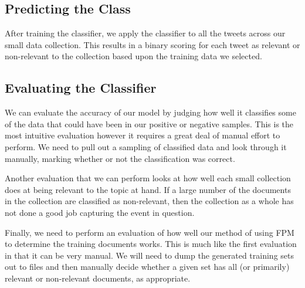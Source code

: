 
\subsection{Predicting the Class}

After training the classifier, we apply the classifier to all the tweets across our small data collection. This results in a binary scoring for each tweet as relevant or non-relevant to the collection based upon the training data we selected.

\subsection{Evaluating the Classifier}

We can evaluate the accuracy of our model by judging how well it classifies some of the data that could have been in our positive or negative samples. This is the most intuitive evaluation however it requires a great deal of manual effort to perform. We need to pull out a sampling of classified data and look through it manually, marking whether or not the classification was correct.

Another evaluation that we can perform looks at how well each small collection does at being relevant to the topic at hand. If a large number of the documents in the collection are classified as non-relevant, then the collection as a whole has not done a good job capturing the event in question.

Finally, we need to perform an evaluation of how well our method of using FPM to determine the training documents works. This is much like the first evaluation in that it can be very manual. We will need to dump the generated training sets out to files and then manually decide whether a given set has all (or primarily) relevant or non-relevant documents, as appropriate.



